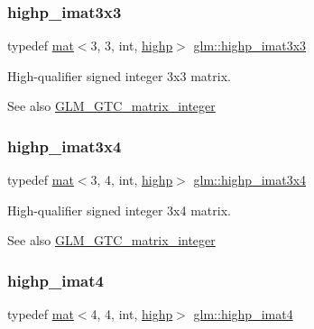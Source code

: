 \subsubsection{\texorpdfstring{highp\+\_\+imat3x3}{highp\_imat3x3}}
{\footnotesize\ttfamily typedef \mbox{\hyperlink{structglm_1_1mat}{mat}}$<$3, 3, int, \mbox{\hyperlink{namespaceglm_a36ed105b07c7746804d7fdc7cc90ff25ac6f7eab42eacbb10d59a58e95e362074}{highp}}$>$ \mbox{\hyperlink{group__gtc__matrix__integer_ga56dfcd09960c88895e72cbdcddc08ae6}{glm\+::highp\+\_\+imat3x3}}}

High-\/qualifier signed integer 3x3 matrix. \begin{DoxySeeAlso}{See also}
\mbox{\hyperlink{group__gtc__matrix__integer}{G\+L\+M\+\_\+\+G\+T\+C\+\_\+matrix\+\_\+integer}} 
\end{DoxySeeAlso}
\mbox{\label{group__gtc__matrix__integer_ga01595d765e0fef9bf01df5e20a811cd3}} 
\subsubsection{\texorpdfstring{highp\+\_\+imat3x4}{highp\_imat3x4}}
{\footnotesize\ttfamily typedef \mbox{\hyperlink{structglm_1_1mat}{mat}}$<$3, 4, int, \mbox{\hyperlink{namespaceglm_a36ed105b07c7746804d7fdc7cc90ff25ac6f7eab42eacbb10d59a58e95e362074}{highp}}$>$ \mbox{\hyperlink{group__gtc__matrix__integer_ga01595d765e0fef9bf01df5e20a811cd3}{glm\+::highp\+\_\+imat3x4}}}

High-\/qualifier signed integer 3x4 matrix. \begin{DoxySeeAlso}{See also}
\mbox{\hyperlink{group__gtc__matrix__integer}{G\+L\+M\+\_\+\+G\+T\+C\+\_\+matrix\+\_\+integer}} 
\end{DoxySeeAlso}
\mbox{\label{group__gtc__matrix__integer_ga2f3fec7874f434d081a186d11ccbed3c}} 
\subsubsection{\texorpdfstring{highp\+\_\+imat4}{highp\_imat4}}
{\footnotesize\ttfamily typedef \mbox{\hyperlink{structglm_1_1mat}{mat}}$<$4, 4, int, \mbox{\hyperlink{namespaceglm_a36ed105b07c7746804d7fdc7cc90ff25ac6f7eab42eacbb10d59a58e95e362074}{highp}}$>$ \mbox{\hyperlink{group__gtc__matrix__integer_ga2f3fec7874f434d081a186d11ccbed3c}{glm\+::highp\+\_\+imat4}}}

